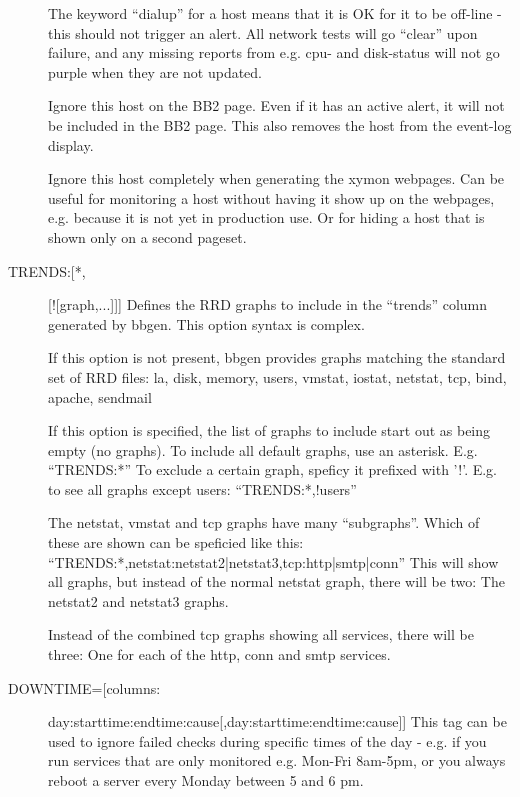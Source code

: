 \begin{description}
 

\item[] The keyword ``dialup'' for a host means that it is OK
  for it to be off-line - this should not trigger an alert. All
  network tests will go ``clear'' upon failure, and any missing
  reports from e.g. cpu- and disk-status will not go purple when they
  are not updated. 


 

\item[] Ignore this host on the BB2 page. Even if it has an
  active alert, it will not be included in the BB2 page. This also
  removes the host from the event-log display. 


 

\item[] Ignore this host completely when generating the xymon
  webpages. Can be useful for monitoring a host without having it show
  up on the webpages, e.g. because it is not yet in production use. Or
  for hiding a host that is shown only on a second pageset. 


 

\item[TRENDS:[*,][![graph,...]]] Defines the RRD graphs to include in
  the ``trends'' column generated by bbgen. This option syntax is
  complex.  

 If this option is not present, bbgen provides graphs matching the
 standard set of RRD files: la, disk, memory, users, vmstat, iostat,
 netstat, tcp, bind, apache, sendmail  

 If this option is specified, the list of graphs to include start out as being empty (no graphs).  
 To include all default graphs, use an asterisk. E.g. ``TRENDS:*''  
 To exclude a certain graph, speficy it prefixed with '!'. E.g. to see
 all graphs except users: ``TRENDS:*,!users''  

 The netstat, vmstat and tcp graphs have many ``subgraphs''. Which of these are shown can be speficied like this:
 ``TRENDS:*,netstat:netstat2|netstat3,tcp:http|smtp|conn'' This will
 show all graphs, but instead of the normal netstat graph, there will
 be two: The netstat2 and netstat3 graphs. 

Instead of the combined tcp graphs showing all services, there will be three: One
 for each of the http, conn and smtp services. 


 

\item[DOWNTIME=[columns:]day:starttime:endtime:cause[,day:starttime:endtime:cause]]
  This tag can be used to ignore failed checks during specific times
  of the day - e.g. if you run services that are only monitored
  e.g. Mon-Fri 8am-5pm, or you always reboot a server every Monday
  between 5 and 6 pm. 



\end{description}
